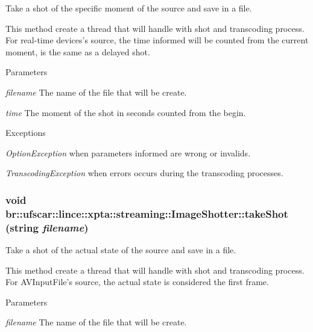 Take a shot of the specific moment of the source and save in a file. 

This method create a thread that will handle with shot and transcoding process. For real-\/time devices's source, the time informed will be counted from the current moment, is the same as a delayed shot. 
\begin{DoxyParams}{Parameters}
\item[{\em filename}]The name of the file that will be create. \item[{\em time}]The moment of the shot in seconds counted from the begin. \end{DoxyParams}

\begin{DoxyExceptions}{Exceptions}
\item[{\em OptionException}]when parameters informed are wrong or invalids. \item[{\em TranscodingException}]when errors occurs during the transcoding processes. \end{DoxyExceptions}
\hypertarget{classbr_1_1ufscar_1_1lince_1_1xpta_1_1streaming_1_1ImageShotter_a81423686fdfd9103f7312ac14449c557}{
\subsubsection[{takeShot}]{\setlength{\rightskip}{0pt plus 5cm}void br::ufscar::lince::xpta::streaming::ImageShotter::takeShot (string {\em filename})}}
\label{classbr_1_1ufscar_1_1lince_1_1xpta_1_1streaming_1_1ImageShotter_a81423686fdfd9103f7312ac14449c557}


Take a shot of the actual state of the source and save in a file. 

This method create a thread that will handle with shot and transcoding process. For AVInputFile's source, the actual state is considered the first frame. 
\begin{DoxyParams}{Parameters}
\item[{\em filename}]The name of the file that will be create. \end{DoxyParams}

